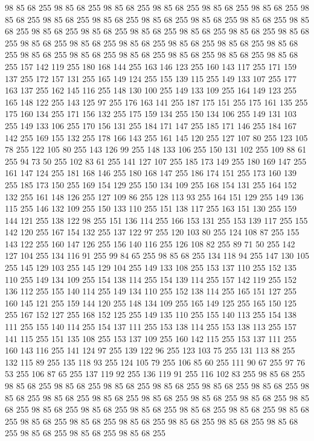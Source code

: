 98 85 68 255 98 85 68 255 98 85 68 255 98 85 68 255 98 85 68 255 98 85 68 255 98 85 68 255 98 85 68 255 98 85 68 255 98 85 68 255 98 85 68 255 98 85 68 255 98 85 68 255 98 85 68 255 98 85 68 255 98 85 68 255 98 85 68 255 98 85 68 255 98 85 68 255 98 85 68 255 98 85 68 255 98 85 68 255 98 85 68 255 98 85 68 255 98 85 68 255 98 85 68 255 98 85 68 255 98 85 68 255 98 85 68 255 98 85 68 255 98 85 68 255 157 142 119 255 180 168 144 255 163 146 123 255 160 143 117 255 171 159 137 255 172 157 131 255 165 149 124 255 155 139 115 255 149 133 107 255 177 163 137 255 162 145 116 255 148 130 100 255 149 133 109 255 164 149 123 255 165 148 122 255 143 125 97 255 176 163 141 255 187 175 151 255 175 161 135 255 175 160 134 255 171 156 132 255 175 159 134 255 150 134 106 255 149 131 103 255 149 133 106 255 170 156 131 255 184 171 147 255 185 171 146 255 184 167 142 255 169 155 132 255 178 166 143 255 161 145 120 255 127 107 80 255
123 105 78 255 122 105 80 255 143 126 99 255 148 133 106 255 150 131 102 255 109 88 61 255 94 73 50 255 102 83 61 255 141 127 107 255 185 173 149 255 180 169 147 255 161 147 124 255 181 168 146 255 180 168 147 255 186 174 151 255 173 160 139 255 185 173 150 255 169 154 129 255 150 134 109 255 168 154 131 255 164 152 132 255 161 148 126 255 127 109 86 255 128 113 93 255 164 151 129 255 149 136 115 255 146 132 109 255 150 133 110 255 151 138 117 255 163 151 130 255 159 144 121 255 138 122 98 255 151 136 114 255 166 153 131 255 153 139 117 255 155 142 120 255 167 154 132 255 137 122 97 255 120 103 80 255 124 108 87 255 155 143 122 255 160 147 126 255 156 140 116 255 126 108 82 255 89 71 50 255 142 127 104 255 134 116 91 255 99 84 65 255 98 85 68 255 134 118 94 255 147 130 105 255 145 129 103 255 145 129 104 255 149 133 108 255 153 137 110 255 152 135 110 255 149 134 109 255 154 138 114 255 154 139 114 255 157 142 119 255 152 136 112 255 155 140 114 255 149 134 110 255 152 138 114 255
165 151 127 255 160 145 121 255 159 144 120 255 148 134 109 255 165 149 125 255 165 150 125 255 167 152 127 255 168 152 125 255 149 135 110 255 155 140 113 255 154 138 111 255 155 140 114 255 154 137 111 255 153 138 114 255 153 138 113 255 157 141 115 255 151 135 108 255 153 137 109 255 160 142 115 255 153 137 111 255 160 143 116 255 141 124 97 255 139 122 96 255 123 103 75 255 131 113 88 255 132 115 89 255 135 118 93 255 124 105 79 255 106 85 60 255 111 90 67 255 97 76 53 255 106 87 65 255 137 119 92 255 136 119 91 255 116 102 83 255 98 85 68 255 98 85 68 255 98 85 68 255 98 85 68 255 98 85 68 255 98 85 68 255 98 85 68 255 98 85 68 255 98 85 68 255 98 85 68 255 98 85 68 255 98 85 68 255 98 85 68 255 98 85 68 255 98 85 68 255 98 85 68 255 98 85 68 255 98 85 68 255 98 85 68 255 98 85 68 255 98 85 68 255 98 85 68 255 98 85 68 255 98 85 68 255 98 85 68 255 98 85 68 255 98 85 68 255 98 85 68 255 98 85 68 255
